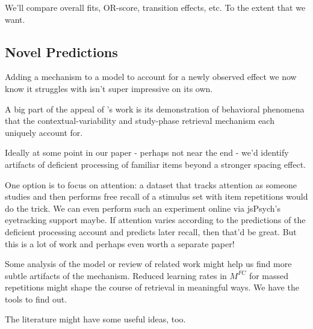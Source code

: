 We'll compare overall fits, OR-score, transition effects, etc. To the extent that we want.

\subsection{Novel Predictions}
Adding a mechanism to a model to account for a newly observed effect we now know it struggles with isn't super impressive on its own. 

A big part of the appeal of \citet{siegel2014retrieved}'s work is its demonstration of behavioral phenomena that the contextual-variability and study-phase retrieval mechanism each uniquely account for. 

Ideally at some point in our paper - perhaps not near the end - we'd identify artifacts of deficient processing of familiar items beyond a stronger spacing effect.

One option is to focus on attention: a dataset that tracks attention as someone studies and then performs free recall of a stimulus set with item repetitions would do the trick. We can even perform such an experiment online via jsPsych's eyetracking support maybe. If attention varies according to the predictions of the deficient processing account and predicts later recall, then that'd be great. But this is a lot of work and perhaps even worth a separate paper!

Some analysis of the model or review of related work might help us find more subtle artifacts of the mechanism. Reduced learning rates in $M^{FC}$ for massed repetitions might shape the course of retrieval in meaningful ways. We have the tools to find out.

The literature might have some useful ideas, too. 